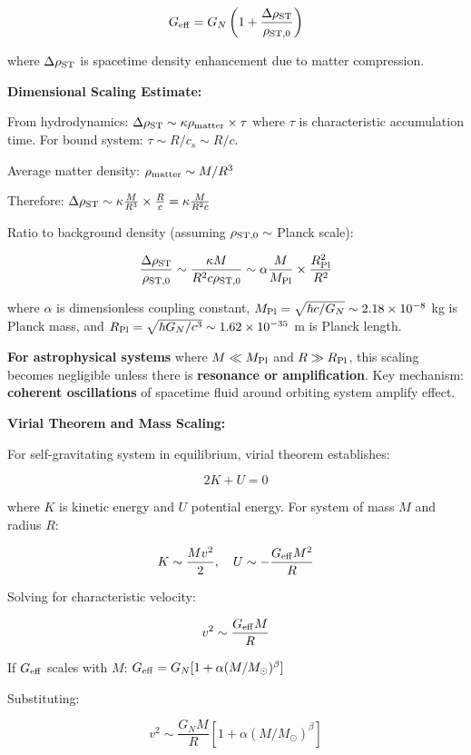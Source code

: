 \documentclass[11pt,a4paper]{article}
\begin{document}
\[G_{\rm eff} = G_N \left(1 + \frac{\Delta \rho_{\rm ST}}{\rho_{\rm ST,0}}\right)\]

where \(\Delta \rho_{\rm ST}\) is spacetime density enhancement due to
matter compression.

\textbf{Dimensional Scaling Estimate:}

From hydrodynamics:
\(\Delta \rho_{\rm ST} \sim \kappa \rho_{\rm matter} \times \tau\) where
\(\tau\) is characteristic accumulation time. For bound system:
\(\tau \sim R/c_s \sim R/c\).

Average matter density: \(\rho_{\rm matter} \sim M/R^3\)

Therefore:
\(\Delta \rho_{\rm ST} \sim \kappa \frac{M}{R^3} \times \frac{R}{c} = \kappa \frac{M}{R^2 c}\)

Ratio to background density (assuming \(\rho_{\rm ST,0} \sim\) Planck
scale):

\[\frac{\Delta \rho_{\rm ST}}{\rho_{\rm ST,0}} \sim \frac{\kappa M}{R^2 c \rho_{\rm ST,0}} \sim \alpha \frac{M}{M_{\rm Pl}} \times \frac{R_{\rm Pl}^2}{R^2}\]

where \(\alpha\) is dimensionless coupling constant,
\(M_{\rm Pl} = \sqrt{\hbar c/G_N} \sim 2.18 \times 10^{-8}\) kg is
Planck mass, and
\(R_{\rm Pl} = \sqrt{\hbar G_N/c^3} \sim 1.62 \times 10^{-35}\) m is
Planck length.

\textbf{For astrophysical systems} where \(M \ll M_{\rm Pl}\) and
\(R \gg R_{\rm Pl}\), this scaling becomes negligible unless there is
\textbf{resonance or amplification}. Key mechanism: \textbf{coherent
oscillations} of spacetime fluid around orbiting system amplify effect.

\textbf{Virial Theorem and Mass Scaling:}

For self-gravitating system in equilibrium, virial theorem establishes:

\[2 K + U = 0\]

where \(K\) is kinetic energy and \(U\) potential energy. For system of
mass \(M\) and radius \(R\):

\[K \sim \frac{M v^2}{2}, \quad U \sim -\frac{G_{\rm eff} M^2}{R}\]

Solving for characteristic velocity:

\[v^2 \sim \frac{G_{\rm eff} M}{R}\]

If \(G_{\rm eff}\) scales with \(M\):
\(G_{\rm eff} = G_N[1 + \alpha (M/M_\odot)^\beta]\)

Substituting:

\[v^2 \sim \frac{G_N M}{R}[1 + \alpha (M/M_\odot)^\beta]\]
\end{document}
